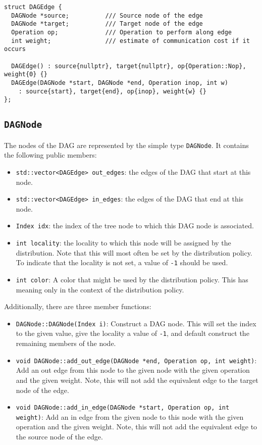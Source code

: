 \begin{verbatim}
struct DAGEdge {
  DAGNode *source;          /// Source node of the edge
  DAGNode *target;          /// Target node of the edge
  Operation op;             /// Operation to perform along edge
  int weight;               /// estimate of communication cost if it occurs

  DAGEdge() : source{nullptr}, target{nullptr}, op{Operation::Nop}, weight{0} {}
  DAGEdge(DAGNode *start, DAGNode *end, Operation inop, int w)
    : source{start}, target{end}, op{inop}, weight{w} {}
};
\end{verbatim}

\subsection{\texttt{DAGNode}}

The nodes of the DAG are represented by the simple type \texttt{DAGNode}. It
contains the following public members:

\begin{itemize}
  \item \texttt{std::vector<DAGEdge> out\_edges}: the edges of the DAG that
    start at this node.
  \item \texttt{std::vector<DAGEdge> in\_edges}: the edges of the DAG that end
    at this node.
  \item \texttt{Index idx}: the index of the tree node to which this DAG node
    is associated.
  \item \texttt{int locality}: the locality to which this node will be assigned
    by the distribution. Note that this will most often be set by the
    distribution policy. To indicate that the locality is not set, a value of
    \texttt{-1} should be used.
  \item \texttt{int color}: A color that might be used by the distribution
    policy. This has meaning only in the context of the distribution policy.
\end{itemize}

\noindent Additionally, there are three member functions:

\begin{itemize}
  \item \texttt{DAGNode::DAGNode(Index i)}: Construct a DAG node. This will set
    the index to the given value, give the locality a value of \texttt{-1}, and
    default construct the remaining members of the node.
  \item \texttt{void DAGNode::add\_out\_edge(DAGNode *end, Operation op,
    int weight)}: Add an out edge from this node to the given node with the
    given operation and the given weight. Note, this will not add the equivalent
    edge to the target node of the edge.
  \item \texttt{void DAGNode::add\_in\_edge(DAGNode *start, Operation op,
    int weight)}: Add an in edge from the given node to this node with the
    given operation and the given weight. Note, this will not add the equivalent
    edge to the source node of the edge.
\end{itemize}


